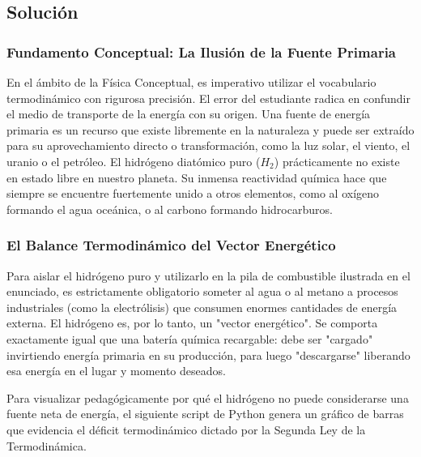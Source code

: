\documentclass[12pt,a4paper]{article}
\begin{document}
\subsection*{Solución}

\subsubsection*{Fundamento Conceptual: La Ilusión de la Fuente Primaria}
En el ámbito de la Física Conceptual, es imperativo utilizar el vocabulario termodinámico con rigurosa precisión. El error del estudiante radica en confundir el medio de transporte de la energía con su origen. Una fuente de energía primaria es un recurso que existe libremente en la naturaleza y puede ser extraído para su aprovechamiento directo o transformación, como la luz solar, el viento, el uranio o el petróleo. 
El hidrógeno diatómico puro ($H_2$) prácticamente no existe en estado libre en nuestro planeta. Su inmensa reactividad química hace que siempre se encuentre fuertemente unido a otros elementos, como al oxígeno formando el agua oceánica, o al carbono formando hidrocarburos. 

\subsubsection*{El Balance Termodinámico del Vector Energético}
Para aislar el hidrógeno puro y utilizarlo en la pila de combustible ilustrada en el enunciado, es estrictamente obligatorio someter al agua o al metano a procesos industriales (como la electrólisis) que consumen enormes cantidades de energía externa. El hidrógeno es, por lo tanto, un "vector energético". Se comporta exactamente igual que una batería química recargable: debe ser "cargado" invirtiendo energía primaria en su producción, para luego "descargarse" liberando esa energía en el lugar y momento deseados.

Para visualizar pedagógicamente por qué el hidrógeno no puede considerarse una fuente neta de energía, el siguiente script de Python genera un gráfico de barras que evidencia el déficit termodinámico dictado por la Segunda Ley de la Termodinámica.
\end{document}
